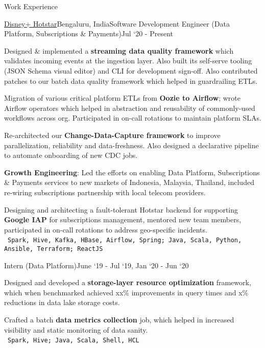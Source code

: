 \documentclass{resume}
\begin{document}
  
  \begin{rSection}{Work Experience}
  
    \begin{rSubsection}{\href{https://tech.hotstar.com/}{Disney+ Hotstar}}{Bengaluru, India}{Software Development Engineer (Data Platform, Subscriptions \& Payments)}{Jul `20 - Present}
      \item Designed \& implemented a \textbf{streaming data quality framework} which validates incoming events at the ingestion layer. Also built its self-serve tooling (JSON Schema visual editor) and CLI for development sign-off. Also contributed patches to our batch data quality framework which helped in guardrailing ETLs.
      \item Migration of various critical platform ETLs from \textbf{Oozie to Airflow}; wrote Airflow operators which helped in abstraction and reusability of commonly-used workflows across org. Participated in on-call rotations to maintain platform SLAs.
      \item Re-architected our \textbf{Change-Data-Capture framework} to improve parallelization, reliability and data-freshness. Also designed a declarative pipeline to automate onboarding of new CDC jobs.
      \item \textbf{Growth Engineering}: Led the efforts on enabling Data Platform, Subscriptions \& Payments services to new markets of Indonesia, Malaysia, Thailand, included re-wiring subscriptions partnership with local telecom providers.
      \item Designing and architecting a fault-tolerant Hotstar backend for supporting \textbf{Google IAP} for subscriptions management, mentored new team members, participated in on-call rotations to address geo-specific incidents.\\
    \textbullet\ \texttt{Spark, Hive, Kafka, HBase, Airflow, Spring; Java, Scala, Python, Ansible, Terraform; ReactJS}
    \end{rSubsection}
    
    \vspace*{-\baselineskip}

    \begin{rSubsection}{}{}{Intern (Data Platform)}{June `19 - Jul `19, Jan `20 - Jun `20}
    \item Designed and developed a \textbf{storage-layer resource optimization} framework, which when benchmarked achieved xx\% improvements in query times and x\% reductions in data lake storage costs.
    \item Crafted a batch \textbf{data metrics collection} job, which helped in increased visibility and static monitoring of data sanity.\\
    \textbullet\ \texttt{Spark, Hive; Java, Scala, Shell, HCL}
    \end{rSubsection}


\end{rSection}
\end{document}
